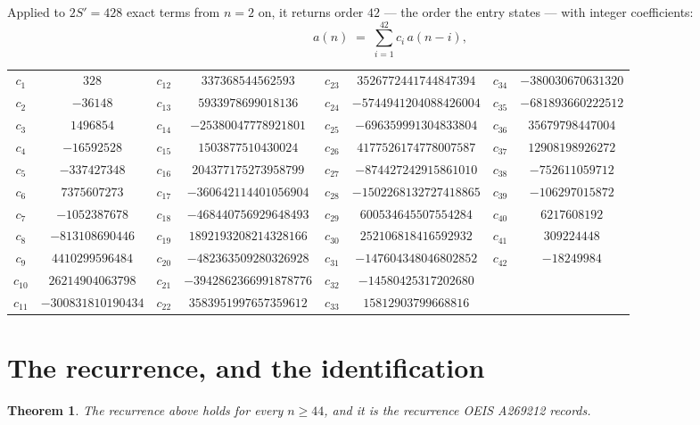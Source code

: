 \documentclass[11pt,a4paper]{article}
\theoremstyle{plain}
\newtheorem{theorem}{Theorem}
\theoremstyle{definition}
\begin{document}
Applied to $2S'=428$ exact terms from $n=2$ on, it returns order $42$ --- the
order the entry states --- with integer coefficients:
\[
a(n)\;=\;\sum_{i=1}^{42}c_i\,a(n-i),
\]
\begin{center}\small
\begin{tabular}{cccccccc}
$c_{1}$ & $328$ & $c_{12}$ & $337368544562593$ & $c_{23}$ & $3526772441744847394$ & $c_{34}$ & $-380030670631320$ \\
$c_{2}$ & $-36148$ & $c_{13}$ & $5933978699018136$ & $c_{24}$ & $-5744941204088426004$ & $c_{35}$ & $-681893660222512$ \\
$c_{3}$ & $1496854$ & $c_{14}$ & $-25380047778921801$ & $c_{25}$ & $-696359991304833804$ & $c_{36}$ & $35679798447004$ \\
$c_{4}$ & $-16592528$ & $c_{15}$ & $1503877510430024$ & $c_{26}$ & $4177526174778007587$ & $c_{37}$ & $12908198926272$ \\
$c_{5}$ & $-337427348$ & $c_{16}$ & $204377175273958799$ & $c_{27}$ & $-874427242915861010$ & $c_{38}$ & $-752611059712$ \\
$c_{6}$ & $7375607273$ & $c_{17}$ & $-360642114401056904$ & $c_{28}$ & $-1502268132727418865$ & $c_{39}$ & $-106297015872$ \\
$c_{7}$ & $-1052387678$ & $c_{18}$ & $-468440756929648493$ & $c_{29}$ & $600534645507554284$ & $c_{40}$ & $6217608192$ \\
$c_{8}$ & $-813108690446$ & $c_{19}$ & $1892193208214328166$ & $c_{30}$ & $252106818416592932$ & $c_{41}$ & $309224448$ \\
$c_{9}$ & $4410299596484$ & $c_{20}$ & $-482363509280326928$ & $c_{31}$ & $-147604348046802852$ & $c_{42}$ & $-18249984$ \\
$c_{10}$ & $26214904063798$ & $c_{21}$ & $-3942862366991878776$ & $c_{32}$ & $-14580425317202680$ &  &  \\
$c_{11}$ & $-300831810190434$ & $c_{22}$ & $3583951997657359612$ & $c_{33}$ & $15812903799668816$ &  &  \\
\end{tabular}
\end{center}

\section{The recurrence, and the identification}

\begin{theorem}
The recurrence above holds for every $n\ge44$, and it is the recurrence OEIS A269212 records.
\end{theorem}
\end{document}
